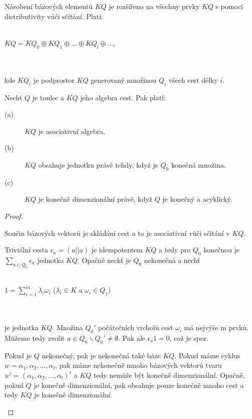     \begin{pzn}
      Násobení bázových elementů $KQ$ je rozšířeno na všechny prvky $KQ$ s pomocí 
      distributivity vůči sčítání. Platí: \\\\
      \centerline{$KQ=KQ_0\oplus KQ_1\oplus\ldots\oplus KQ_l\oplus\ldots$,}\\\\
      kde $KQ_i$ je podprostor $KQ$ generovaný množinou $Q_i$ všech cest délky 
      $i$.
    \end{pzn}
    
    \begin{lem}\label{quiver-kq-lemma}
      Nechť $Q$ je toulec a $KQ$ jeho algebra cest. Pak platí:
      \begin{description}
        \item[(a)] $KQ$ je asociativní algebra. 
        \item[(b)] $KQ$ obsahuje jednotku právě tehdy, když je $Q_0$ konečná množina.
        \item[(c)] $KQ$ je konečně dimenzionální právě, když $Q$ je konečný a acyklický.
      \end{description}      
    \end{lem}
    \begin{proof}
      \begin{description}
        \item 
        \item[(a)]Součin bázových vektorů je skládání cest a to je asociativní vůči 
      sčítání v $KQ$.
        \item[(b)]Triviální cesta $\epsilon_a=(a||a)$ je idempotentem $KQ$ a tedy pro $Q_0$ 
      konečnou je $\sum_{a\in Q_0}\epsilon_a$ jednotka $KQ$. Opačně nechť je $Q_0$ 
      nekonečná a nechť \\\\
      \centerline{$1=\sum_{i=1}^m \lambda_i \omega_i$ ($\lambda_i\in K$ a $\omega_i\in Q_1$)} 
      \\\\
      je jednotka $KQ$. Množina $Q_0'$ počátečních vrcholů  cest $\omega_i$ 
      má nejvýše m prvků. Můžeme tedy zvolit $a\in Q_0\backslash
      Q_0'\neq\emptyset$. Pak ale $\epsilon_a 1=0$, což je spor.

        \item[(c)]Pokud je $Q$ nekonečný, pak je nekonečná také báze $KQ$. Pokud máme 
      cyklus $w=\alpha_1,\alpha_2,\ldots,\alpha_l$, pak máme nekonečně mnoho bázových 
      vektorů tvaru $w^t=(\alpha_1,\alpha_2,\ldots,\alpha_l)^t$ a $KQ$ tedy nemůže být 
      konečně dimenzionální. Opačně, pokud $Q$ je konečně dimenzionální, pak 
      obsahuje pouze konečně mnoho cest a tedy $KQ$ je konečně dimenzionální.
      \end{description}
    \end{proof}
    
